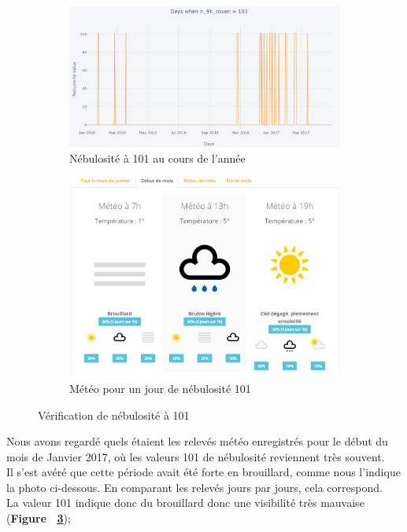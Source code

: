 \documentclass{article} %
\begin{document}
\begin{figure}
	\centering
	\begin{subfigure}{0.5\textwidth}
		\centering
		\includegraphics[keepaspectratio = true,scale=0.55]{neb101.png}
		\caption{Nébulosité à 101 au cours de l'année}
		\label{fig:neb1}
	\end{subfigure}%
	\begin{subfigure}{0.5\textwidth}
		\centering
		\includegraphics[keepaspectratio = true,scale=0.45]{meteo.png}
		\caption{Météo pour un jour de nébulosité 101}
		\label{fig:meteo}
	\end{subfigure}
	\caption{Vérification de nébulosité à 101}
\end{figure}
Nous avons regardé quels étaient les relevés météo enregistrés pour le début du mois de Janvier 2017, où les valeurs 101 de nébulosité reviennent très souvent.\\
Il s'est avéré que cette période avait été forte en brouillard, comme nous l’indique la photo ci-dessous. En comparant les relevés jours par jours, cela correspond. \\
La valeur 101 indique donc du brouillard donc une visibilité très mauvaise (\textbf{Figure ~\ref{fig:meteo}});
\end{document}
